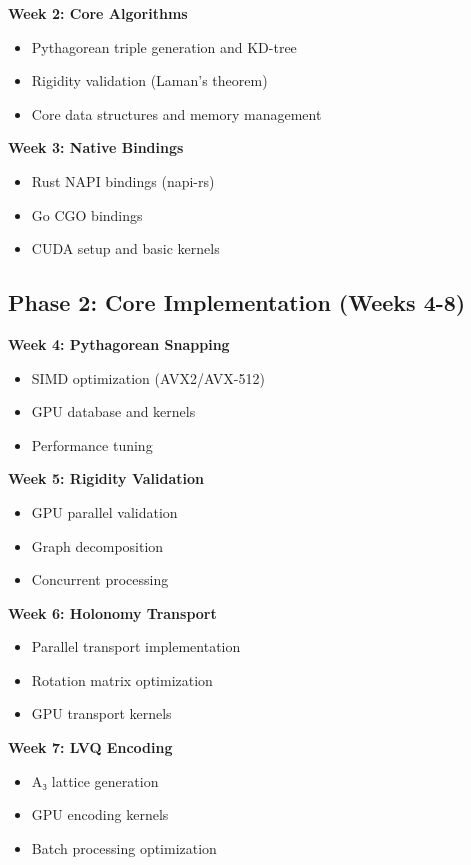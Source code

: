 \documentclass{article}
\begin{document}
\textbf{Week 2: Core Algorithms}
\begin{itemize}
    \item Pythagorean triple generation and KD-tree
    \item Rigidity validation (Laman's theorem)
    \item Core data structures and memory management
\end{itemize}

\textbf{Week 3: Native Bindings}
\begin{itemize}
    \item Rust NAPI bindings (napi-rs)
    \item Go CGO bindings
    \item CUDA setup and basic kernels
\end{itemize}

\subsection{Phase 2: Core Implementation (Weeks 4-8)}

\textbf{Week 4: Pythagorean Snapping}
\begin{itemize}
    \item SIMD optimization (AVX2/AVX-512)
    \item GPU database and kernels
    \item Performance tuning
\end{itemize}

\textbf{Week 5: Rigidity Validation}
\begin{itemize}
    \item GPU parallel validation
    \item Graph decomposition
    \item Concurrent processing
\end{itemize}

\textbf{Week 6: Holonomy Transport}
\begin{itemize}
    \item Parallel transport implementation
    \item Rotation matrix optimization
    \item GPU transport kernels
\end{itemize}

\textbf{Week 7: LVQ Encoding}
\begin{itemize}
    \item A₃ lattice generation
    \item GPU encoding kernels
    \item Batch processing optimization
\end{itemize}
\end{document}
